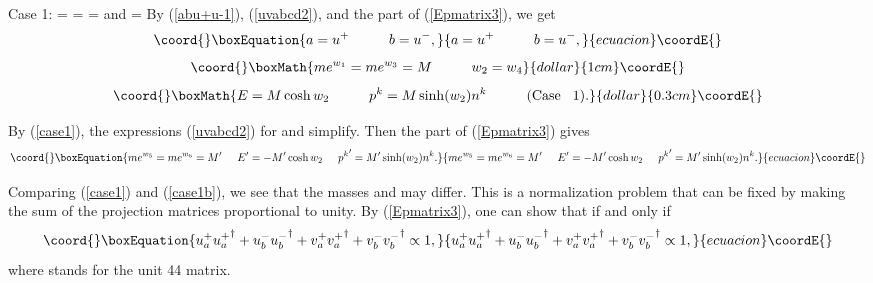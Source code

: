 \documentclass[a4paper,12pt]{article}
\begin{document}
	Case 1: \coordHE{} = \coordHE{}  \coordHE{} = \coordHE{}  \coordHE{} = \coordHE{} and \coordHE{} = \coordHE{} By (\ref{abu+u-1}), (\ref{uvabcd2}), and the \coordHE{} part of (\ref{Epmatrix3}), we get %
\begin{equation}\coord{}\boxEquation{	\label{case1}
 a =  u^{+}  \hspace{1cm} b = u^{-}, 
}{	a =  u^{+}  \hspace{1cm} b = u^{-}, 
}{ecuacion}\coordE{}\end{equation}
$$\coord{}\boxMath{m e^{w_{1}} = m e^{w_{3}} =  M \hspace{1cm} w_{2} = w_{4} }{dollar}{1cm}\coordE{}$$  $$\coord{}\boxMath{ E = M \cosh w_{2} \hspace{1cm} p^{k} =  M \sinh (w_{2}) n^{k} \hspace{1cm}  {\mathrm{(Case}} \hspace{0.3cm} {\mathrm{1)}}. }{dollar}{0.3cm}\coordE{}$$

	By (\ref{case1}), the expressions (\ref{uvabcd2}) for \coordHE{} and \coordHE{} simplify. Then the \coordHE{} part of (\ref{Epmatrix3}) gives
\begin{equation}\coord{}\boxEquation{	\label{case1b}
 m e^{w_{5}} = m e^{w_{6}} =  M^{\prime} \hspace{0.5cm}  E^{\prime} = -  M^{\prime} \cosh w_{2} \hspace{0.5cm} {p^{k}}^{\prime} =  M^{\prime} \sinh (w_{2}) n^{k} .
}{	m e^{w_{5}} = m e^{w_{6}} =  M^{\prime} \hspace{0.5cm}  E^{\prime} = -  M^{\prime} \cosh w_{2} \hspace{0.5cm} {p^{k}}^{\prime} =  M^{\prime} \sinh (w_{2}) n^{k} .
}{ecuacion}\coordE{}\end{equation}

	Comparing (\ref{case1}) and (\ref{case1b}), we see that the masses \coordHE{} and \coordHE{} may differ. This is a normalization problem that can be fixed by making the sum of the projection matrices proportional to unity. By (\ref{Epmatrix3}), one can show that \coordHE{} if and only if
\begin{equation}\coord{}\boxEquation{	\label{case1c}
 u^{+}_{a} {u^{+}_{a}}^{\dagger} + u^{-}_{b} {u^{-}_{b}}^{\dagger} + v^{+}_{a} {v^{+}_{a}}^{\dagger} + v^{-}_{b} {v^{-}_{b}}^{\dagger} \propto 1,
}{	u^{+}_{a} {u^{+}_{a}}^{\dagger} + u^{-}_{b} {u^{-}_{b}}^{\dagger} + v^{+}_{a} {v^{+}_{a}}^{\dagger} + v^{-}_{b} {v^{-}_{b}}^{\dagger} \propto 1,
}{ecuacion}\coordE{}\end{equation}
where \coordHE{} stands for the unit 4\myHighlight{$\times$}\coordHE{}4 matrix.
\end{document}
